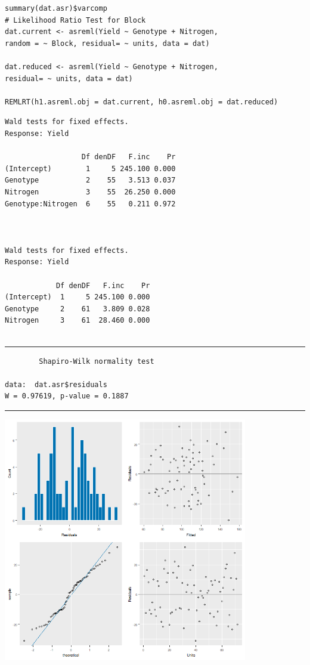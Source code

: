 \documentclass[a4paper, 10pt, fleqn, twosided]{memoir}
\begin{document}
\begin{tcolorbox}[title = Exercise 13 code]
\begin{verbatim}
summary(dat.asr)$varcomp
# Likelihood Ratio Test for Block
dat.current <- asreml(Yield ~ Genotype + Nitrogen,
random = ~ Block, residual= ~ units, data = dat)

dat.reduced <- asreml(Yield ~ Genotype + Nitrogen,
residual= ~ units, data = dat)

REMLRT(h1.asreml.obj = dat.current, h0.asreml.obj = dat.reduced)
\end{verbatim}
\end{tcolorbox}

\begin{tcolorbox}[title = Exercise 13 output]
\begin{verbatim}
Wald tests for fixed effects.
Response: Yield

                  Df denDF   F.inc    Pr
(Intercept)        1     5 245.100 0.000
Genotype           2    55   3.513 0.037
Nitrogen           3    55  26.250 0.000
Genotype:Nitrogen  6    55   0.211 0.972



Wald tests for fixed effects.
Response: Yield

            Df denDF   F.inc    Pr
(Intercept)  1     5 245.100 0.000
Genotype     2    61   3.809 0.028
Nitrogen     3    61  28.460 0.000


\end{verbatim}
{\color{outpt} {\hrule height 1pt}}
\begin{verbatim}
        Shapiro-Wilk normality test

data:  dat.asr$residuals
W = 0.97619, p-value = 0.1887

\end{verbatim}
{\color{outpt} {\hrule height 1pt}} \vspace{0.2cm}

\includegraphics[width=0.8\textwidth, frame]{Exercise13Resplot2.png}
\end{tcolorbox}
\end{document}

